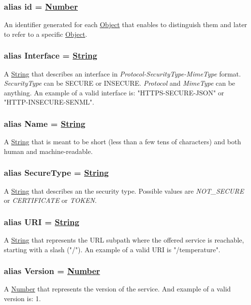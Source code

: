 \documentclass[a4paper]{arrowhead}
\newcommand{\pdef}[1]{{\textcolor{ArrowheadGrey}{#1 \label{sec:model:primitives:#1} \label{sec:model:primitives:#1s}}}}
\newcommand{\pref}[1]{{\textcolor{ArrowheadGrey}{\hyperref[sec:model:primitives:#1]{#1}}}}
\begin{document}
\subsubsection{alias \pdef{id} = \pref{Number}}

An identifier generated for each \pref{Object} that enables to distinguish them and later to refer to a specific \pref{Object}.

\subsubsection{alias \pdef{Interface} = \pref{String}}

A \pref{String} that describes an interface in \textit{Protocol-SecurityType-MimeType} format. \textit{SecurityType} can be SECURE or INSECURE. \textit{Protocol} and \textit{MimeType} can be anything. An example of a valid interface is: "HTTPS-SECURE-JSON" or "HTTP-INSECURE-SENML".

\subsubsection{alias \pdef{Name} = \pref{String}}

A \pref{String} that is meant to be short (less than a few tens of characters) and both human and machine-readable.

\subsubsection{alias \pdef{SecureType} = \pref{String}}

A \pref{String} that describes an the security type. Possible values are \textit{NOT\_SECURE} or \textit{CERTIFICATE} or \textit{TOKEN}.

\subsubsection{alias \pdef{URI} = \pref{String}}

A \pref{String} that represents the URL subpath where the offered service is reachable, starting with a slash ("/"). An example of a valid URI is "/temperature".

\subsubsection{alias \pdef{Version} = \pref{Number}}

A \pref{Number} that represents the version of the service. And example of a valid version is: 1.
\end{document}
